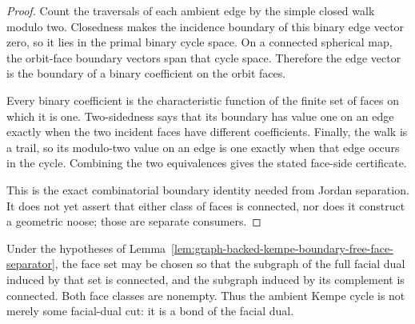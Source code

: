 \begin{proof}
Count the traversals of each ambient edge by the simple closed walk modulo
two.  Closedness makes the incidence boundary of this binary edge vector
zero, so it lies in the primal binary cycle space.  On a connected spherical
map, the orbit-face boundary vectors span that cycle space.  Therefore the
edge vector is the boundary of a binary coefficient on the orbit faces.

Every binary coefficient is the characteristic function of the finite set
of faces on which it is one.  Two-sidedness says that its boundary has value
one on an edge exactly when the two incident faces have different
coefficients.  Finally, the walk is a trail, so its modulo-two value on an
edge is one exactly when that edge occurs in the cycle.  Combining the two
equivalences gives the stated face-side certificate.

This is the exact combinatorial boundary identity needed from Jordan
separation.  It does not yet assert that either class of faces is connected,
nor does it construct a geometric noose; those are separate consumers.
\end{proof}

\begin{lemma}
\label{lem:graph-backed-kempe-face-sides-connected}
Under the hypotheses of
Lemma~\ref{lem:graph-backed-kempe-boundary-free-face-separator}, the face set
may be chosen so that the subgraph of the full facial dual induced by that
set is connected, and the subgraph induced by its complement is connected.
Both face classes are nonempty.  Thus the ambient Kempe cycle is not merely
some facial-dual cut: it is a bond of the facial dual.
\end{lemma}

